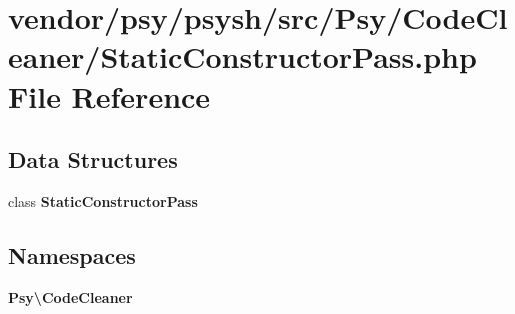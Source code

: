 \section{vendor/psy/psysh/src/\+Psy/\+Code\+Cleaner/\+Static\+Constructor\+Pass.php File Reference}
\label{_static_constructor_pass_8php}
\subsection*{Data Structures}
\begin{DoxyCompactItemize}
\item 
class {\bf Static\+Constructor\+Pass}
\end{DoxyCompactItemize}
\subsection*{Namespaces}
\begin{DoxyCompactItemize}
\item 
 {\bf Psy\textbackslash{}\+Code\+Cleaner}
\end{DoxyCompactItemize}
